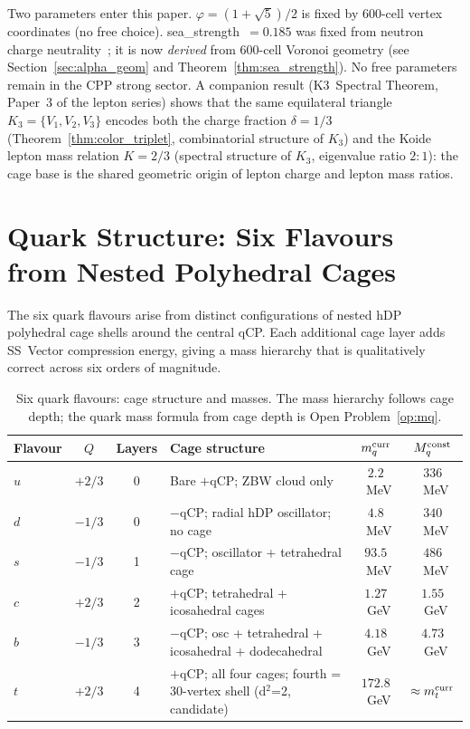\documentclass[11pt,a4paper]{article}
\newcommand{\phig}{\varphi}
\begin{document}
Two parameters enter this paper.  $\phig = (1+\sqrt5)/2$ is fixed by
600-cell vertex coordinates (no free choice).  sea\_strength~$= 0.185$
was fixed from neutron charge neutrality~\citep{cpp5014}; it is now
\emph{derived} from 600-cell Voronoi geometry (see
Section~\ref{sec:alpha_geom} and Theorem~\ref{thm:sea_strength}).
No free parameters remain in the CPP strong sector.
A companion result (K3~Spectral Theorem, Paper~3 of the lepton series)
shows that the same equilateral triangle $K_3 = \{V_1,V_2,V_3\}$
encodes both the charge fraction $\delta = 1/3$ (Theorem~\ref{thm:color_triplet},
combinatorial structure of $K_3$) and the Koide lepton mass relation
$K = 2/3$ (spectral structure of $K_3$, eigenvalue ratio $2{:}1$):
the cage base is the shared geometric origin of lepton charge and
lepton mass ratios.

\section{Quark Structure: Six Flavours from Nested Polyhedral Cages}
\label{sec:quarks}

The six quark flavours arise from distinct configurations of nested
hDP polyhedral cage shells around the central qCP.  Each additional
cage layer adds SS~Vector compression energy, giving a mass hierarchy
that is qualitatively correct across six orders of magnitude.

\begin{table}[H]
\centering
\caption{Six quark flavours: cage structure and masses.  The mass
  hierarchy follows cage depth; the quark mass formula from cage
  depth is Open Problem~\ref{op:mq}.}
\label{tab:quarks}
\begin{tabular}{@{}lccp{5.2cm}cc@{}}
\toprule
Flavour & $Q$ & Layers & Cage structure & $m_q^{\rm curr}$ & $M_q^{\rm const}$ \\
\midrule
$u$ & $+2/3$ & 0 & Bare $+$qCP; ZBW cloud only
  & $2.2$~MeV & $336$~MeV \\
$d$ & $-1/3$ & 0 & $-$qCP; radial hDP oscillator; no cage
  & $4.8$~MeV & $340$~MeV \\
$s$ & $-1/3$ & 1 & $-$qCP; oscillator + tetrahedral cage
  & $93.5$~MeV & $486$~MeV \\
$c$ & $+2/3$ & 2 & $+$qCP; tetrahedral + icosahedral cages
  & $1.27$~GeV & $1.55$~GeV \\
$b$ & $-1/3$ & 3 & $-$qCP; osc + tetrahedral + icosahedral + dodecahedral
  & $4.18$~GeV & $4.73$~GeV \\
$t$ & $+2/3$ & 4 & $+$qCP; all four cages; fourth = 30-vertex shell (d$^2$=2, candidate)
  & $172.8$~GeV & $\approx m_t^{\rm curr}$ \\
\bottomrule
\end{tabular}
\end{table}
\end{document}
